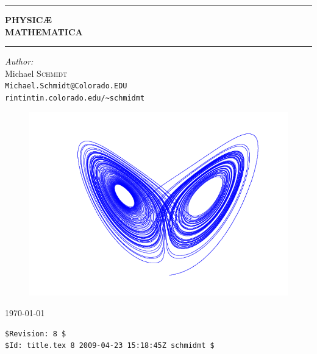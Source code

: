 \begin{titlepage}
\begin{center}
\hrule
{ \huge \bfseries PHYSIC\AE\\  MATHEMATICA}\\[0.5cm]
\hrule

\emph{Author:}\\
Michael \textsc{Schmidt}\\
\texttt{Michael.Schmidt@Colorado.EDU}\\
\texttt{rintintin.colorado.edu/\~{}schmidmt}

\begin{figure}[!h]
	\centering
	\includegraphics[scale=0.60]{./attractor.png}
\end{figure}

\vfill
{\large \today}\\
\begin{verbatim}
$Revision: 8 $
$Id: title.tex 8 2009-04-23 15:18:45Z schmidmt $
\end{verbatim}

\end{center}
\end{titlepage}
